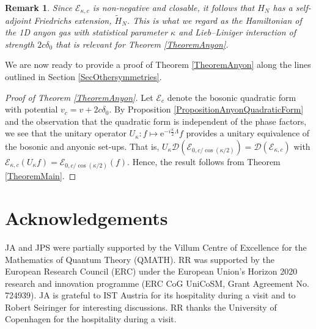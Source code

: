 \documentclass[a4paper,11pt]{article}
\newcommand{\euler}[1]{\text{e}^{#1}}
\newcommand{\dom}[1]{\mathcal D\left(#1\right)}
\newtheorem{remark}[theorem]{Remark}
\numberwithin{equation}{section}
\begin{document}
	\begin{remark}\label{RemarkAnyons}
		Since $ \mathcal{E}_{\kappa,c}$ is non-negative and closable, it follows that $ H_N $ has a self-adjoint Friedrichs extension, $ \tilde{H}_N $. This is what we regard as the Hamiltonian of the 1D anyon gas with statistical parameter $ \kappa $ and Lieb--Liniger interaction of strength $2c\delta_0 $ that is relevant for Theorem \ref{TheoremAnyon}.
	\end{remark}
	
	We are now ready to provide a proof of Theorem \ref{TheoremAnyon} along the lines outlined in Section \ref{SecOthersymmetries}.
	
	\begin{proof}[Proof of Theorem \ref{TheoremAnyon}]
		Let $ \mathcal{E}_c $ denote the bosonic quadratic form with potential $ v_c=v+2c\delta_0 $. By Proposition \ref{PropositionAnyonQuadraticForm} and the observation that the quadratic form is independent of the phase factors, we see that the unitary operator $ U_\kappa: f\mapsto \euler{-i\frac{\kappa}{2}\Lambda}f $ provides a unitary equivalence of the bosonic and anyonic set-ups. That is, $ U_\kappa\dom{\mathcal{E}_{0,c/\cos(\kappa/2)}}=\dom{\mathcal{E}_{\kappa,c}} $ with $ \mathcal{E}_{\kappa,c}(U_\kappa f)=\mathcal{E}_{0,c/\cos(\kappa/2)}(f) $. Hence, the result follows from Theorem \ref{TheoremMain}.
	\end{proof}
	\section{Acknowledgements}
	JA and JPS were partially supported by the Villum Centre of Excellence for the Mathematics of Quantum Theory (QMATH). RR was supported by the European Research Council (ERC) under the European Union’s Horizon 2020 research and innovation programme (ERC CoG UniCoSM, Grant Agreement No. 724939). JA is grateful to IST Austria for its hospitality during a visit  and to Robert Seiringer for interesting discussions. RR thanks the University of Copenhagen for the hospitality during a visit.
	
	
\end{document}
